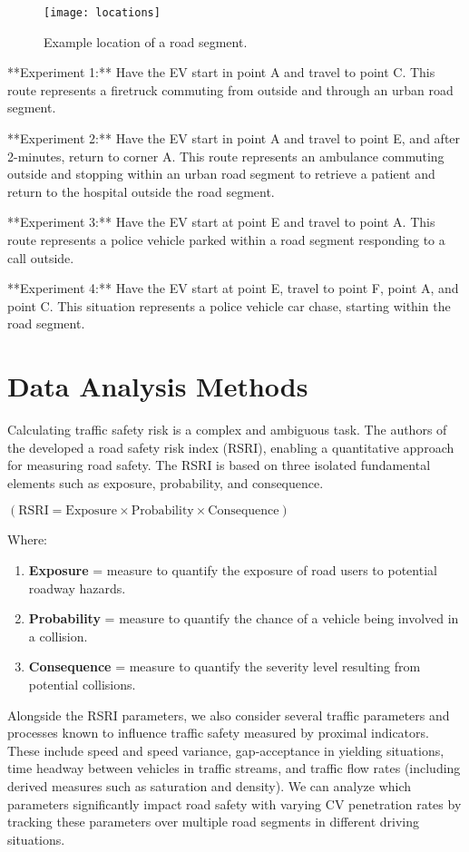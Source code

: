 \begin{figure}
\texttt{[image: locations]}
\caption{Example location of a road segment.}
\label{fig:locations}
\end{figure}

**Experiment 1:**
Have the \acrshort{EV} start in point A and travel to point C.
This route represents a firetruck commuting from outside and through an urban road segment.

**Experiment 2:**
Have the \acrshort{EV} start in point A and travel to point E, and after 2-minutes, return to corner A.
This route represents an ambulance commuting outside and stopping within an urban road segment to retrieve a patient and return to the hospital outside the road segment.

**Experiment 3:**
Have the \acrshort{EV} start at point E and travel to point A.
This route represents a police vehicle parked within a road segment responding to a call outside.

**Experiment 4:**
Have the \acrshort{EV} start at point E, travel to point F, point A, and point C.
This situation represents a police vehicle car chase, starting within the road segment.

\section{Data Analysis Methods}

Calculating traffic safety risk is a complex and ambiguous task. The authors of the \cite{leur_sayed_2002} developed a road safety risk index (RSRI), enabling a quantitative approach for measuring road safety. The RSRI is based on three isolated fundamental elements such as exposure, probability, and consequence.

\(( \text{RSRI} = \text{Exposure} \times \text{Probability} \times \text{Consequence} )\)

Where:
\begin{enumerate}
\item \textbf{Exposure} = measure to quantify the exposure of road users to potential roadway hazards.
\item \textbf{Probability} = measure to quantify the chance of a vehicle being involved in a collision.
\item \textbf{Consequence} = measure to quantify the severity level resulting from potential collisions.
\end{enumerate}

Alongside the RSRI parameters, we also consider several traffic parameters and processes known to influence traffic safety measured by proximal indicators. These include speed and speed variance, gap-acceptance in yielding situations, time headway between vehicles in traffic streams, and traffic flow rates (including derived measures such as saturation and density). We can analyze which parameters significantly impact road safety with varying CV penetration rates by tracking these parameters over multiple road segments in different driving situations.

